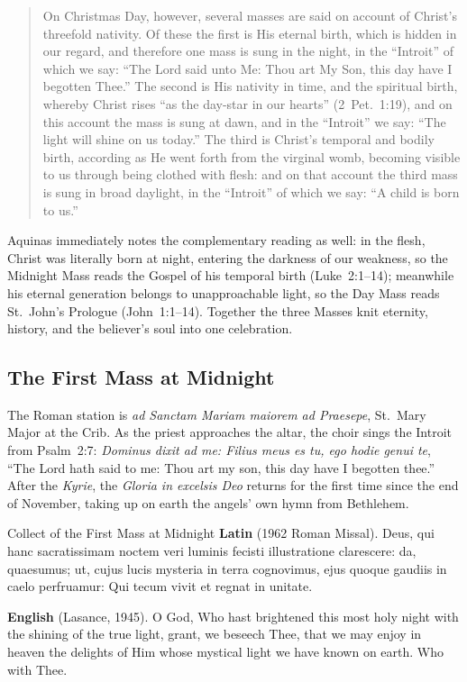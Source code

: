 \begin{quote}
On Christmas Day, however, several masses are said on account of Christ's
threefold nativity. Of these the first is His eternal birth, which is hidden in
our regard, and therefore one mass is sung in the night, in the ``Introit'' of
which we say: ``The Lord said unto Me: Thou art My Son, this day have I begotten
Thee.'' The second is His nativity in time, and the spiritual birth, whereby
Christ rises ``as the day-star in our hearts'' (2~Pet.\ 1:19), and on this
account the mass is sung at dawn, and in the ``Introit'' we say: ``The light
will shine on us today.'' The third is Christ's temporal and bodily birth,
according as He went forth from the virginal womb, becoming visible to us
through being clothed with flesh: and on that account the third mass is sung in
broad daylight, in the ``Introit'' of which we say: ``A child is born to us.''
\end{quote}

Aquinas immediately notes the complementary reading as well: in the flesh,
Christ was literally born at night, entering the darkness of our weakness, so
the Midnight Mass reads the Gospel of his temporal birth (Luke~2:1--14);
meanwhile his eternal generation belongs to unapproachable light, so the Day
Mass reads St.~John's Prologue (John~1:1--14). Together the three Masses knit
eternity, history, and the believer's soul into one celebration.

\subsection{The First Mass at Midnight}

The Roman station is \textit{ad Sanctam Mariam maiorem ad Praesepe}, St.~Mary
Major at the Crib. As the priest approaches the altar, the choir sings the
Introit from Psalm~2:7: \textit{Dominus dixit ad me: Filius meus es tu, ego
hodie genui te}, ``The Lord hath said to me: Thou art my son, this day have I
begotten thee.'' After the \textit{Kyrie}, the \textit{Gloria in excelsis Deo}
returns for the first time since the end of November, taking up on earth the
angels' own hymn from Bethlehem.

\begin{massbox}{Collect of the First Mass at Midnight}
\textbf{Latin} (1962 Roman Missal). Deus, qui hanc sacratissimam noctem veri
luminis fecisti illustratione clarescere: da, quaesumus; ut, cujus lucis
mysteria in terra cognovimus, ejus quoque gaudiis in caelo perfruamur: Qui
tecum vivit et regnat in unitate.

\textbf{English} (Lasance, 1945). O God, Who hast brightened this most holy
night with the shining of the true light, grant, we beseech Thee, that we may
enjoy in heaven the delights of Him whose mystical light we have known on earth.
Who with Thee.
\end{massbox}

